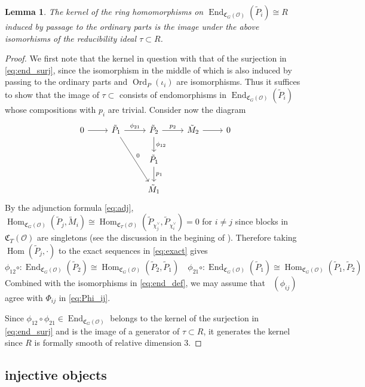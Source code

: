 \documentclass[leqno]{amsart}
\DeclareMathOperator{\Ord}{Ord}
\DeclareMathOperator{\V}{\check{\mathbf{V}}} %
\newcommand{\oo}{\mathcal O}
\newcommand{\1}{\mathbf{1}}
\newcommand{\fC}{\mathfrak C}
\DeclareMathOperator{\End}{End}
\DeclareMathOperator{\Hom}{Hom}
\newtheorem{lem}[thm]{Lemma}
\theoremstyle{definition}
\theoremstyle{remark}
\begin{document}
\begin{lem}\label{lem:ker_ord}
	The kernel of the ring homomorphisms
	on $\End_{\fC_G(\oo)}(\tilde{P}_i)\cong R$
	induced by passage to the ordinary parts
	is the image under the above isomorhisms
	of the reducibility ideal $\tau\subset R$.
\end{lem}
\begin{proof}

We first note that the kernel in question 
with that of the surjection in \eqref{eq:end_surj},
since the isomorphism in the middle of which
is also induced by passing to the ordinary parts
and $\Ord_P(\iota_i)$ are isomorphisms.
Thus it suffices to show that 
the image of $\tau\subset$
consists of endomorphisms  in  $\End_{\fC_G(\oo)}(\tilde{P}_i)$
whose compositions with $p_i$ are trivial.
Consider now the diagram
\[
	\begin{tikzcd}
		0 \arrow[r]&
		\tilde{P}_1  \arrow[r,"\phi_{21}"] \arrow[ddr,"0"] &
		\tilde{P}_2 \arrow[r,"p_2"] \arrow[d,"\phi_{12}"] &
		\tilde{M}_2  \arrow[r] & 0 \\
		 &
		 &
		\tilde{P}_1  \arrow[d,"p_1"] &
		 & \\
				      &  
				      & \tilde{M}_1  & & 
	\end{tikzcd}
\]
By the adjunction formula \eqref{eq:adj}, 
$\Hom_{\fC_G(\oo)}(\tilde{P}_j,\tilde{M}_i)\cong
\Hom_{\fC_T(\oo)}(\tilde{P}_{\chi_j^\vee}, \tilde{P}_{\chi_i^\vee})=0$
for $i\neq j$
since blocks in $\fC_T(\oo)$ are singletons
(see the discussion in the begining of \cite[\S 7.2]{pask}).
Therefore taking $\Hom(\tilde{P}_j,\cdot)$ to the exact sequences in
\eqref{eq:exact} gives
\[
	\phi_{12}\circ\colon
	\End_{\fC_G(\oo)}(\tilde{P}_2)\cong
	\Hom_{\fC_G(\oo)}(\tilde{P}_2, \tilde{P}_1)\quad
	\phi_{21}\circ\colon
	\End_{\fC_G(\oo)}(\tilde{P}_1)\cong
	\Hom_{\fC_G(\oo)}(\tilde{P}_1, \tilde{P}_2)
\]
Combined with the isomorphisms in \eqref{eq:end_def},
we may assume that $\V(\phi_{ij})$ agree with 
$\Phi_{ij}$ in \eqref{eq:Phi_ij}.

Since $\phi_{12}\circ\phi_{21}\in \End_{\fC_G(\oo)}$
belongs to the kernel of the surjection in \eqref{eq:end_surj}
and is the image of a generator 
of $\tau\subset R$,
it generates the kernel 
since  $R$ is formally smooth of relative dimension  $3$.
\end{proof}




\subsection{injective objects}
\end{document}
